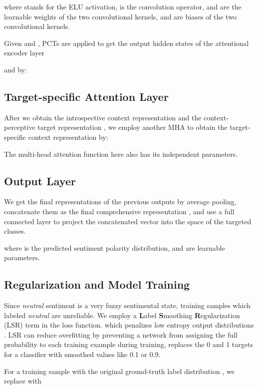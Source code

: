 \documentclass[11pt,a4paper]{article}
\begin{document}
where  stands for the ELU activation,
 is the convolution operator,
 and 
are the learnable weights of the two convolutional kernels,
 and 
are biases of the two convolutional kernels.

Given  and ,
PCTs are applied to get the output hidden states of the attentional encoder layer

and 
by:




\subsection{Target-specific Attention Layer}

After we obtain the introspective context representation  and
the context-perceptive target representation ,
we employ another MHA to obtain the target-specific context representation  by:

The multi-head attention function here also has its independent parameters.

\subsection{Output Layer}

We get the final representations of the previous outputs by average pooling,
concatenate them as the final comprehensive representation ,
and use a full connected layer to project the concatenated vector into the space of the targeted  classes.

where  is the predicted sentiment polarity distribution,
 and  are learnable parameters.

\subsection{Regularization and Model Training} \label{sec:LSR}

Since \textit{neutral} sentiment is a very fuzzy sentimental state, training samples which labeled \textit{neutral} are unreliable.
We employ a \textbf{L}abel \textbf{S}moothing \textbf{R}egularization (LSR) term in the loss function.
which penalizes low entropy output distributions \cite{szegedy2016rethinking}.
LSR can reduce overfitting by preventing a network from assigning the full probability to each training example during training, replaces the 0 and 1 targets for a classifier with smoothed values like 0.1 or 0.9.

For a training sample  with the original ground-truth label distribution ,
we replace  with
\end{document}
